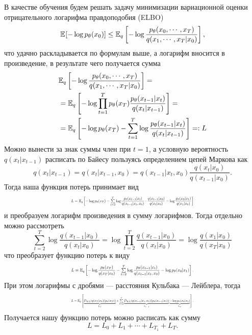 \documentclass[11pt, a4paper, twocolumn, twoside]{article} %
\begin{document}
В качестве обучения будем решать задачу минимизации вариационной оценки отрицательного логарифма правдоподобия (ELBO)
\begin{equation}
	\mathbb{E}_{}[-\log p_\theta(x_0)] \leq \mathbb{E}_{q}\left[-\log\dfrac{p_\theta(x_0, \cdots, x_T)}{q(x_1, \cdots, x_T|x_0)}\right],
\end{equation} 
что удачно раскладывается по формулам выше, а логарифм вносится в произведение, в результате чего получается сумма
\begin{equation*}
	\begin{aligned}
		& \mathbb{E}_{q}\left[-\log\dfrac{p_\theta(x_0, \cdots, x_T)}{q(x_1, \cdots, x_T|x_0)}\right] =\\
		& = \mathbb{E}_{q}\left[-\log\prod\limits_{t=1}^Tp_\theta(x_T)\dfrac{p_\theta(x_{t-1}| x_t)}{q(x_t| x_{t-1})}\right] = \\ 
		&= \mathbb{E}_{q}\left[-\log p_\theta(x_T)-\sum\limits_{t=1}^T\log\dfrac{p_\theta(x_{t-1}| x_t)}{q(x_t| x_{t-1})}\right] =: L
	\end{aligned}
\end{equation*}
Можно вынести за знак суммы член при $t=1$, а условную вероятность $q(x_t|x_{t-1})$ расписать по Байесу пользуясь определением цепей Маркова как
\begin{equation*}
	q(x_t|x_{t-1}) = q(x_t|x_{t-1}, x_0) = q(x_{t-1}| x_t, x_0)\dfrac{q(x_t|x_0)}{q(x_{t-1}|x_0)}.
\end{equation*} 
Тогда наша функция потерь принимает вид
\begin{equation*}
	\resizebox{0.5\textwidth}{!}{$
L = \mean{q}\left[-\log p_\theta(x_T)-\sum\limits_{t=2}^T\log\dfrac{p_\theta(x_{t-1}| x_t)}{q(x_{t-1}| x_t, x_0)}\cdot \dfrac{q(x_{t-1}|x_0)}{q(x_t|x_0)} - \log\dfrac{p_\theta(x_0|x_1)}{q(x_1|x_0)}\right]
$}
\end{equation*}
и преобразуем логарифм произведения в сумму логарифмов. Тогда отдельно можно рассмотреть 
\begin{equation*}
	\sum\limits_{t=2}^T\log\dfrac{q(x_{t-1}|x_0)}{q(x_t|x_0)} = \log\prod\limits_{t=2}^T\dfrac{q(x_{t-1}|x_0)}{q(x_t|x_0)} = \log\dfrac{q(x_1|x_0)}{q(x_T|x_0)}
\end{equation*}
что преобразует функцию потерь к виду
\begin{equation*}
	\resizebox{0.5\textwidth}{!}{$
L = \mean{q}\left[-\log\dfrac{p_\theta(x_T)}{q(x_T|x_0)} -\sum\limits_{t=2}^T\log\dfrac{p_\theta(x_{t-1}| x_t)}{q(x_{t-1}| x_t, x_0)} - \log p_\theta(x_0|x_1)\right].
$}
\end{equation*}
При этом логарифмы с дробями — расстояния Кульбака — Лейблера, тогда
\begin{equation}
	\resizebox{0.5\textwidth}{!}{$
L = \mean{q}\left[\underbrace{D_{KL}(q(x_T|x_0)|| p_\theta(x_T))}_{L_T} +\sum\limits_{t=2}^T\underbrace{D_{KL}(q(x_{t-1}| x_t, x_0)||p_\theta(x_{t-1}| x_t))}_{L_{t-1}}\underbrace{-\log p_\theta(x_0|x_1)}_{L_0}\right].
$}	
\end{equation}
Получается нашу функцию потерь можно расписать как сумму 
\begin{equation*}
	L = L_0 + L_1 + \cdots + L_{T_1} + L_T.
\end{equation*}
\end{document}
